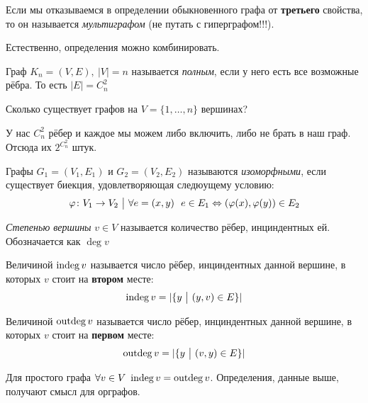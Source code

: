 \begin{definition}
	Если мы отказываемся в определении обыкновенного графа от \textbf{третьего} свойства, то он называется \textit{мультиграфом} (не путать с гиперграфом!!!).
\end{definition}

\begin{note}
	Естественно, определения можно комбинировать.
\end{note}

\begin{definition}
	Граф $K_n = (V, E),\ |V| = n$ называется \textit{полным}, если у него есть все возможные рёбра. То есть $|E| = C_n^2$
\end{definition}

\begin{example}
	Сколько существует графов на $V = \{1, \ldots, n\}$ вершинах?
	
	У нас $C_n^2$ рёбер и каждое мы можем либо включить, либо не брать в наш граф. Отсюда их $2^{C_n^2}$ штук.
\end{example}

\begin{definition}
	Графы $G_1 = (V_1, E_1)$ и $G_2 = (V_2, E_2)$ называются \textit{изоморфными}, если существует биекция, удовлетворяющая следюущему условию:
	\[
		\varphi \colon V_1 \to V_2 \ \big|\  \forall e = (x, y)\ \ e \in E_1 \Leftrightarrow (\varphi(x), \varphi(y)) \in E_2
	\]
\end{definition}

\begin{definition}
	\textit{Степенью вершины} $v \in V$ называется количество рёбер, инциндентных ей. Обозначается как $\deg v$
\end{definition}

\begin{definition}
	Величиной $\operatorname{indeg} v$ называется число рёбер, инциндентных данной вершине, в которых $v$ стоит на \textbf{втором} месте:
	\[
		\operatorname{indeg} v = |\{y \ \big|\  (y, v) \in E\}|
	\]
\end{definition}

\begin{definition}
	Величиной $\operatorname{outdeg} v$ называется число рёбер, инциндентных данной вершине, в которых $v$ стоит на \textbf{первом} месте:
	\[
		\operatorname{outdeg} v = |\{y \ \big|\  (v, y) \in E\}|
	\]
\end{definition}

\begin{note}
	Для простого графа $\forall v \in V\ \operatorname{indeg} v = \operatorname{outdeg} v$. Определения, данные выше, получают смысл для орграфов.
\end{note}

